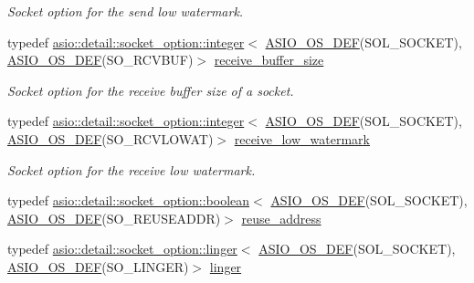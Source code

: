 \begin{DoxyCompactItemize}
\begin{DoxyCompactList}\small\item\em Socket option for the send low watermark. \end{DoxyCompactList}\item 
typedef \hyperlink{classasio_1_1detail_1_1socket__option_1_1integer}{asio\+::detail\+::socket\+\_\+option\+::integer}$<$ \hyperlink{socket__types_8hpp_a26e0208fa086ac48cf5af1b2a521c74a}{A\+S\+I\+O\+\_\+\+O\+S\+\_\+\+D\+E\+F}(S\+O\+L\+\_\+\+S\+O\+C\+K\+E\+T), \hyperlink{socket__types_8hpp_a26e0208fa086ac48cf5af1b2a521c74a}{A\+S\+I\+O\+\_\+\+O\+S\+\_\+\+D\+E\+F}(S\+O\+\_\+\+R\+C\+V\+B\+U\+F)$>$ \hyperlink{classasio_1_1socket__base_a7d102a034ff7e2a71dfe6434c6ba0525}{receive\+\_\+buffer\+\_\+size}
\begin{DoxyCompactList}\small\item\em Socket option for the receive buffer size of a socket. \end{DoxyCompactList}\item 
typedef \hyperlink{classasio_1_1detail_1_1socket__option_1_1integer}{asio\+::detail\+::socket\+\_\+option\+::integer}$<$ \hyperlink{socket__types_8hpp_a26e0208fa086ac48cf5af1b2a521c74a}{A\+S\+I\+O\+\_\+\+O\+S\+\_\+\+D\+E\+F}(S\+O\+L\+\_\+\+S\+O\+C\+K\+E\+T), \hyperlink{socket__types_8hpp_a26e0208fa086ac48cf5af1b2a521c74a}{A\+S\+I\+O\+\_\+\+O\+S\+\_\+\+D\+E\+F}(S\+O\+\_\+\+R\+C\+V\+L\+O\+W\+A\+T)$>$ \hyperlink{classasio_1_1socket__base_acc8a5f622e3b8345e5aa2c4c733bd0fa}{receive\+\_\+low\+\_\+watermark}
\begin{DoxyCompactList}\small\item\em Socket option for the receive low watermark. \end{DoxyCompactList}\item 
typedef \hyperlink{classasio_1_1detail_1_1socket__option_1_1boolean}{asio\+::detail\+::socket\+\_\+option\+::boolean}$<$ \hyperlink{socket__types_8hpp_a26e0208fa086ac48cf5af1b2a521c74a}{A\+S\+I\+O\+\_\+\+O\+S\+\_\+\+D\+E\+F}(S\+O\+L\+\_\+\+S\+O\+C\+K\+E\+T), \hyperlink{socket__types_8hpp_a26e0208fa086ac48cf5af1b2a521c74a}{A\+S\+I\+O\+\_\+\+O\+S\+\_\+\+D\+E\+F}(S\+O\+\_\+\+R\+E\+U\+S\+E\+A\+D\+D\+R)$>$ \hyperlink{classasio_1_1socket__base_a67c5df52b56da13637929727916e4a0a}{reuse\+\_\+address}
\item 
typedef \hyperlink{classasio_1_1detail_1_1socket__option_1_1linger}{asio\+::detail\+::socket\+\_\+option\+::linger}$<$ \hyperlink{socket__types_8hpp_a26e0208fa086ac48cf5af1b2a521c74a}{A\+S\+I\+O\+\_\+\+O\+S\+\_\+\+D\+E\+F}(S\+O\+L\+\_\+\+S\+O\+C\+K\+E\+T), \hyperlink{socket__types_8hpp_a26e0208fa086ac48cf5af1b2a521c74a}{A\+S\+I\+O\+\_\+\+O\+S\+\_\+\+D\+E\+F}(S\+O\+\_\+\+L\+I\+N\+G\+E\+R)$>$ \hyperlink{classasio_1_1socket__base_a0c1a9362331c7574dbf3ec48d2491c34}{linger}

\end{DoxyCompactItemize}
